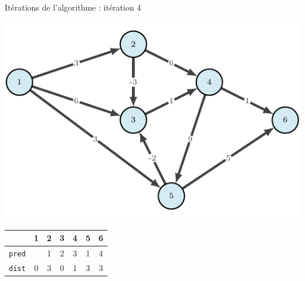 \begin{frame}{Itérations de l'algorithme : itération 4}
    \begin{center}
        \includegraphics[height=.6\textheight]{fig/bellmann-0.pdf}      
    \begin{tabular}{c|cccccc}
      
        & 1    &2      &3      &4      &5      &6      \\
        \hline
        \texttt{pred} & &1      &2      &3      &1      &4      \\
        \texttt{dist} & 0       &3      &0      &1      &3      &3      \\
                    \end{tabular}
\end{center}
\end{frame}


